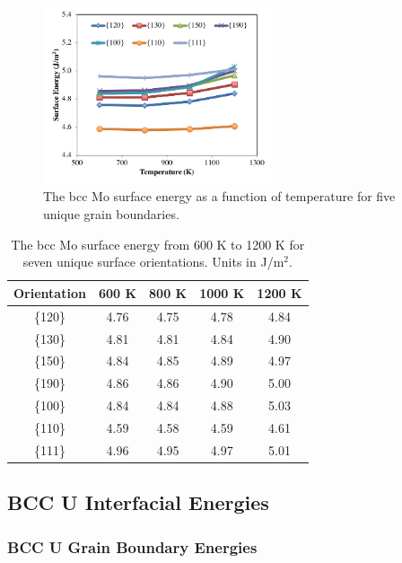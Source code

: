 \documentclass[review]{elsarticle}
\begin{document}
\begin{figure}[h]
 \centering
 \includegraphics[width=0.6\textwidth]{mosurf.png}
 \caption{The bcc Mo surface energy as a function of temperature for five unique grain boundaries.}
 \label{fig:mosurf}
\end{figure}

\begin{table}[h]
\caption{The bcc Mo surface energy from 600 K to 1200 K for seven unique surface orientations. Units in J/m$^{2}$. } \label{tab:mosurf}
\begin{center}
\begin{tabular}{|c|c|c|c|c|}
	\hline
	Orientation & 600 K & 800 K & 1000 K & 1200 K \\
	 \hline
	 \{120\} & 4.76 & 4.75 & 4.78 & 4.84 \\
	 \{130\} & 4.81 & 4.81 & 4.84 & 4.90 \\
	 \{150\} & 4.84 & 4.85 & 4.89 & 4.97 \\
	 \{190\} & 4.86 & 4.86 & 4.90 & 5.00 \\
	 \{100\} & 4.84 & 4.84 & 4.88 & 5.03 \\
	 \{110\} & 4.59 & 4.58 & 4.59 & 4.61 \\
	 \{111\} & 4.96 & 4.95 & 4.97 & 5.01 \\	 
	 \hline
\end{tabular}
\end{center}
\label{default}
\end{table}

\FloatBarrier



\subsection{BCC U Interfacial Energies}
\subsubsection{BCC U Grain Boundary Energies}
\end{document}
